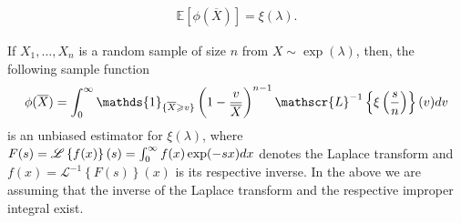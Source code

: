\documentclass[10pt,a4paper]{amsart}
\begin{document}
\begin{align}\label{eq-1}
	\mathbb{E}\left[\phi(\overline{X})\right]
	=
	\xi(\lambda).
\end{align}

\begin{theorem}\label{main theorem}
	If $X_1,\ldots,X_n$ is a random sample of size $n$ from $X\sim\exp(\lambda)$, then, the following sample function
	\begin{align}\label{final-exp}
		\phi(\overline{X})
		=
		\int_0^{\infty} 
		\mathds{1}_{\{\overline{X}\geqslant v\}}
		\left(1-{v\over \overline{X}}\right)^{n-1} 
		\mathscr{L}^{-1}\left\{\xi\left({s\over n}\right)
		\right\}(v){\rm d}v
	\end{align}
	is an unbiased estimator for $\xi(\lambda)$, where $F(s)=\mathscr{L}\left\{f(x)\right\}(s)=\int_0^\infty f(x)\exp(-sx){\rm d}x$ denotes the Laplace transform and $f(x)=\mathscr{L}^{-1}\left\{F(s)\right\}(x)$ is its respective inverse.  In the above we are assuming that the inverse of the Laplace transform and the respective improper integral exist.
\end{theorem}
\end{document}
